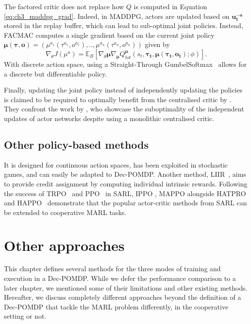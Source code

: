 The factored critic does not replace how $Q$ is computed in Equation \ref{eq:ch3_maddpg_grad}.
Indeed, in MADDPG, actors are updated based on $\mathbf{u_t^{-a}}$ stored in the replay buffer, which can lead to sub-optimal joint policies.
Instead, FACMAC computes a single gradient based on the current joint policy $\mathbf{\mu}(\mathbf{\tau}, \mathbf{o}) = (\mu^{a_1}(\tau^{a_1}, o^{a_1}), .., \mu^{a_n}(\tau^{a_n}, o^{a_n}))$ given by
\begin{equation}
\label{eq:ch3_facmac_grad}
    \nabla_\theta J(\mu^a) = \mathbb{E}_B\left[\nabla_{\theta} \mathbf{\mu} \nabla_{\mathbf{\mu}} Q_{tot}^{\mathbf{\mu}}(s_t, \mathbf{\tau_t}, \mathbf{\mu}(\mathbf{\tau_t}, \mathbf{o_t}); \phi)\right].
\end{equation}
With discrete action space, using a Straight-Through GumbelSoftmax~\citep{jang2017categorical} allows for a discrete but differentiable policy.

Finally, updating the joint policy instead of independently updating the policies is claimed to be required to optimally benefit from the centralised critic by \cite{peng2021facmac}.
They confront the work by \cite{lyu2021contrasting}, who showcase the suboptimality of the independent updates of actor networks despite using a monolithic centralised critic.

\subsection{Other policy-based methods}

It is designed for continuous action spaces, has been exploited in stochastic games, and can easily be adapted to Dec-POMDP.
Another method, LIIR~\citep{Du2019LIIRLearning}, aims to provide credit assignment by computing individual intrinsic rewards.
Following the success of TRPO~\citep{schulman2015trust} and PPO~\citep{schulman2017ppo} in SARL, IPPO \citep{de2020independent}, MAPPO \citep{yu2022surprising} alongside HATPRO and HAPPO~\citep{kuba2021trust} demonstrate that the popular actor-critic methods from SARL can be extended to cooperative MARL tasks.

\section{Other approaches}
\label{sec:ch3_further}
This chapter defines several methods for the three modes of training and execution in a Dec-POMDP.
While we defer the performance comparison to a later chapter, we mentioned some of their limitations and other existing methods.
Hereafter, we discuss completely different approaches beyond the definition of a Dec-POMDP that tackle the MARL problem differently, in the cooperative setting or not.

